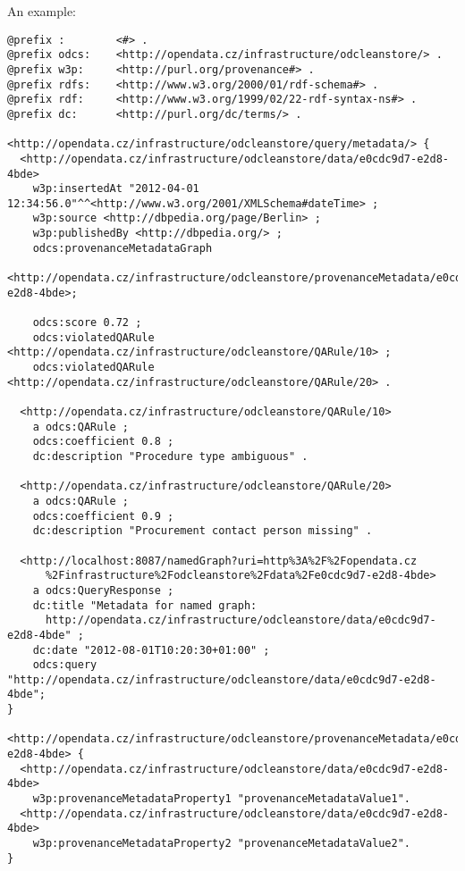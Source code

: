 \pagebreak[3]

An example:

\begin{lstlisting}[caption={Example of query response in TriG},label=lst:trigResponse]
@prefix :        <#> .
@prefix odcs:    <http://opendata.cz/infrastructure/odcleanstore/> .
@prefix w3p:     <http://purl.org/provenance#> .
@prefix rdfs:    <http://www.w3.org/2000/01/rdf-schema#> .
@prefix rdf:     <http://www.w3.org/1999/02/22-rdf-syntax-ns#> .
@prefix dc:      <http://purl.org/dc/terms/> .

<http://opendata.cz/infrastructure/odcleanstore/query/metadata/> {
  <http://opendata.cz/infrastructure/odcleanstore/data/e0cdc9d7-e2d8-4bde>
    w3p:insertedAt "2012-04-01 12:34:56.0"^^<http://www.w3.org/2001/XMLSchema#dateTime> ;
    w3p:source <http://dbpedia.org/page/Berlin> ;
    w3p:publishedBy <http://dbpedia.org/> ;
    odcs:provenanceMetadataGraph
      <http://opendata.cz/infrastructure/odcleanstore/provenanceMetadata/e0cdc9d7-e2d8-4bde>;
        
    odcs:score 0.72 ;
    odcs:violatedQARule <http://opendata.cz/infrastructure/odcleanstore/QARule/10> ;
    odcs:violatedQARule <http://opendata.cz/infrastructure/odcleanstore/QARule/20> .  

  <http://opendata.cz/infrastructure/odcleanstore/QARule/10>
    a odcs:QARule ;
    odcs:coefficient 0.8 ;
    dc:description "Procedure type ambiguous" .
        
  <http://opendata.cz/infrastructure/odcleanstore/QARule/20>
    a odcs:QARule ;
    odcs:coefficient 0.9 ;
    dc:description "Procurement contact person missing" .
        
  <http://localhost:8087/namedGraph?uri=http%3A%2F%2Fopendata.cz
      %2Finfrastructure%2Fodcleanstore%2Fdata%2Fe0cdc9d7-e2d8-4bde>
    a odcs:QueryResponse ;
    dc:title "Metadata for named graph:
      http://opendata.cz/infrastructure/odcleanstore/data/e0cdc9d7-e2d8-4bde" ;
    dc:date "2012-08-01T10:20:30+01:00" ;
    odcs:query "http://opendata.cz/infrastructure/odcleanstore/data/e0cdc9d7-e2d8-4bde";
}
    
<http://opendata.cz/infrastructure/odcleanstore/provenanceMetadata/e0cdc9d7-e2d8-4bde> {
  <http://opendata.cz/infrastructure/odcleanstore/data/e0cdc9d7-e2d8-4bde>
    w3p:provenanceMetadataProperty1 "provenanceMetadataValue1".
  <http://opendata.cz/infrastructure/odcleanstore/data/e0cdc9d7-e2d8-4bde>
    w3p:provenanceMetadataProperty2 "provenanceMetadataValue2".
}
\end{lstlisting}

